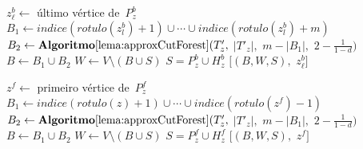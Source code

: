 	\LinesNumberedHidden
	\begin{algorithm}[H]
	\Numberline
		{
			$z^b_\ell \gets $ último vértice de~$P_z^b$\;
			$B_1 \gets indice(rotulo(z^b_l)+1)\cup\cdots\cup indice(rotulo(z^b_l)+m)$\;
			$B_2 \gets \mathbf {Algoritmo\ref{lema:approxCutForest}}(T'_z,$ $|T'_z|,$ $m-|B_1|,$ $2-\frac{1}{1-d})$\;
			$B \gets B_1\cup B_2$\;
			$W \gets V\setminus (B\cup S)$\; 
			$S = P_z^b\cup H^b_z $\;
			\Return $[(B,W,S),$ $z^b_\ell]$\;
		}
		\Else
		{
			\Numberline$z^f \gets $ primeiro vértice de~$P_z^f$\;
			\Numberline$B_1 \gets indice(rotulo(z)+1)\cup\cdots\cup indice(rotulo(z^f)-1)$\;
			\Numberline$B_2 \gets \mathbf {Algoritmo\ref{lema:approxCutForest}}(T'_z,$ $|T'_z|,$ $m-|B_1|,$ $2-\frac{1}{1-d})$\;
			\Numberline$B \gets B_1\cup B_2$\;
			\Numberline$W \gets V\setminus (B\cup S)$\; 
			\Numberline$S = P_z^f\cup H^f_z $\;
			\Numberline\Return $[(B,W,S),$ $z^f]$\;		

		}

	\end{algorithm}	
	\LinesNumbered